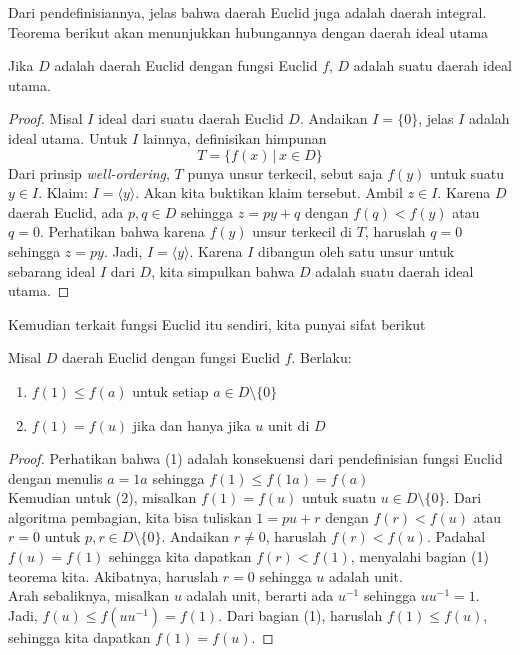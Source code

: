 	Dari pendefinisiannya, jelas bahwa daerah Euclid juga adalah daerah integral. Teorema berikut akan menunjukkan hubungannya dengan daerah ideal utama
	\begin{theorem}
		Jika $D$ adalah daerah Euclid dengan fungsi Euclid $f$, $D$ adalah suatu daerah ideal utama.
	\end{theorem}
	\begin{proof}
		Misal $I$ ideal dari suatu daerah Euclid $D$. Andaikan $I = \{0\}$, jelas $I$ adalah ideal utama. Untuk $I$ lainnya, definisikan himpunan $$T = \{ f(x) \, | \, x\in D \}$$
		Dari prinsip \textit{well-ordering}, $T$ punya unsur terkecil, sebut saja $f(y)$ untuk suatu $y \in I$. Klaim: $I = \langle y \rangle$. Akan kita buktikan klaim tersebut. Ambil $z \in I$. Karena $D$ daerah Euclid, ada $p,q \in D$ sehingga $z = py + q$ dengan $f(q) < f(y)$ atau $q = 0$. Perhatikan bahwa karena $f(y)$ unsur terkecil di $T$, haruslah $q = 0$ sehingga $z = py$. Jadi, $I = \langle y \rangle$. Karena $I$ dibangun oleh satu unsur  untuk sebarang ideal $I$ dari $D$, kita simpulkan bahwa $D$ adalah suatu daerah ideal utama.
	\end{proof}
	Kemudian terkait fungsi Euclid itu sendiri, kita punyai sifat berikut
	\begin{theorem}
		Misal $D$ daerah Euclid dengan fungsi Euclid $f$. Berlaku:
		\begin{enumerate}
			\item $f(1) \le f(a)$ untuk setiap $a \in D \setminus \{0\}$
			\item $f(1) = f(u)$ jika dan hanya jika $u$ unit di $D$
		\end{enumerate}
	\end{theorem}
	\begin{proof}
		Perhatikan bahwa (1) adalah konsekuensi dari pendefinisian fungsi Euclid dengan menulis $a = 1a$ sehingga $f(1) \le f(1a) = f(a)$\\
		
		Kemudian untuk (2), misalkan $f(1) = f(u)$ untuk suatu $u \in D \setminus \{0\}$. Dari algoritma pembagian, kita bisa tuliskan $1 = pu + r$ dengan $f(r) < f(u)$ atau $r = 0$ untuk $p,r \in D \setminus \{0\}$. Andaikan $r \ne 0$, haruslah $f(r) < f(u)$. Padahal $f(u) = f(1)$ sehingga kita dapatkan $f(r) < f(1)$, menyalahi bagian (1) teorema kita. Akibatnya, haruslah $r = 0$ sehingga $u$ adalah unit. \\
		
		Arah sebaliknya, misalkan $u$ adalah unit, berarti ada $u^{-1}$ sehingga $uu^{-1} = 1$. Jadi, $f(u) \le f(uu^{-1}) = f(1)$. Dari bagian (1), haruslah $f(1) \le f(u)$, sehingga kita dapatkan $f(1) = f(u)$.
	\end{proof}
